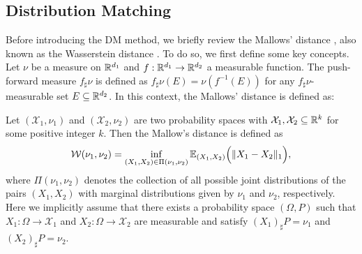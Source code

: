 \subsection{Distribution Matching}\label{subsection: DM}
Before introducing the DM method, we briefly review the Mallows' distance \citep{mallows1972note, shao2012jackknife}, also known as the Wasserstein distance \citep{Villani}. To do so, we first define some key concepts. Let $\nu$ be a measure on $\mathbb{R}^{d_1}$ and $f : \mathbb{R}^{d_1} \rightarrow \mathbb{R}^{d_2}$ a measurable function. The push-forward measure $f_{\sharp}\nu$ is defined as $f_{\sharp}\nu(E) = \nu(f^{-1}(E))$ for any $f_{\sharp}\nu$-measurable set $E \subseteq \mathbb{R}^{d_2}$. In this context, the Mallows' distance is defined as:
\begin{definition}\label{def: Wasserstein-1 distance}
    Let $(\mathcal{X}_1, \nu_1)$ and $(\mathcal{X}_2, \nu_2)$ are two probability spaces with $\mathcal{X}_1, \mathcal{X}_2 \subseteq \mathbb{R}^k$ for some positive integer $k$. Then the Mallow's distance is defined as
    \begin{align}\label{eq: formulation of wasserstein distance}
        \mathcal{W}(\nu_1, \nu_2) = \inf_{(X_1, X_2) \in \Pi(\nu_1, \nu_2)}\mathbb{E}_{(X_1, X_2)}\Big(\Vert{X_1 - X_2}\Vert_1\Big),
    \end{align}
    where $\Pi(\nu_1, \nu_2)$ denotes the collection of all possible joint distributions of the pairs $(X_1, X_2)$ with marginal distributions given by $\nu_1$ and $\nu_2$, respectively. Here we implicitly assume that there exists a probability space $(\Omega, P)$ such that $X_1 : \Omega \to \mathcal{X}_1$ and $X_2: \Omega \to \mathcal{X}_2$ are measurable and satisfy $(X_1)_\sharp P = \nu_1$ and $(X_2)_\sharp P = \nu_2$.
\end{definition}
